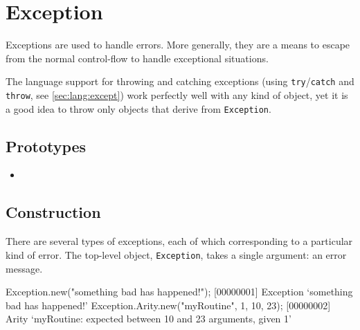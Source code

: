 \section{Exception}

Exceptions are used to handle errors.  More generally, they are a
means to escape from the normal control-flow to handle exceptional
situations.

The language support for throwing and catching exceptions (using
\lstinline|try|/\lstinline|catch| and \lstinline|throw|, see
\autoref{sec:lang:except}) work perfectly well with any kind of
object, yet it is a good idea to throw only objects that derive from
\lstinline|Exception|.

\subsection{Prototypes}
\begin{itemize}
\item {}
\end{itemize}

\subsection{Construction}

There are several types of exceptions, each of which corresponding to
a particular kind of error.  The top-level object,
\lstinline|Exception|, takes a single argument: an error message.

\begin{urbiscript}
Exception.new("something bad has happened!");
[00000001] Exception `something bad has happened!'
Exception.Arity.new("myRoutine", 1, 10, 23);
[00000002] Arity `myRoutine: expected between 10 and 23 arguments, given 1'
\end{urbiscript}


